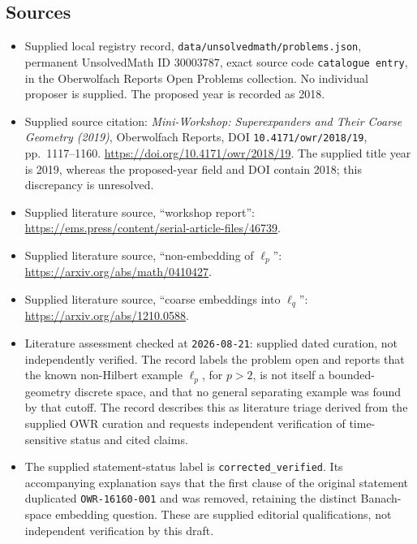 \documentclass[11pt]{article}
\begin{document}
\subsection{Sources}
\begin{itemize}
\item Supplied local registry record, \texttt{data/unsolvedmath/problems.json}, permanent UnsolvedMath ID \(30003787\), exact source code \texttt{catalogue entry}, in the Oberwolfach Reports Open Problems collection. No individual proposer is supplied. The proposed year is recorded as 2018.
\item Supplied source citation: \emph{Mini-Workshop: Superexpanders and Their Coarse Geometry (2019)}, Oberwolfach Reports, DOI \texttt{10.4171/owr/2018/19}, pp.~1117--1160. \url{https://doi.org/10.4171/owr/2018/19}. The supplied title year is 2019, whereas the proposed-year field and DOI contain 2018; this discrepancy is unresolved.
\item Supplied literature source, ``workshop report'': \url{https://ems.press/content/serial-article-files/46739}.
\item Supplied literature source, ``non-embedding of \(\ell_p\)'': \url{https://arxiv.org/abs/math/0410427}.
\item Supplied literature source, ``coarse embeddings into \(\ell_q\)'': \url{https://arxiv.org/abs/1210.0588}.
\item Literature assessment checked at \texttt{2026-08-21}: supplied dated curation, not independently verified. The record labels the problem open and reports that the known non-Hilbert example \(\ell_p\), for \(p>2\), is not itself a bounded-geometry discrete space, and that no general separating example was found by that cutoff. The record describes this as literature triage derived from the supplied OWR curation and requests independent verification of time-sensitive status and cited claims.
\item The supplied statement-status label is \texttt{corrected\_verified}. Its accompanying explanation says that the first clause of the original statement duplicated \texttt{OWR-16160-001} and was removed, retaining the distinct Banach-space embedding question. These are supplied editorial qualifications, not independent verification by this draft.
\end{itemize}
\end{document}
